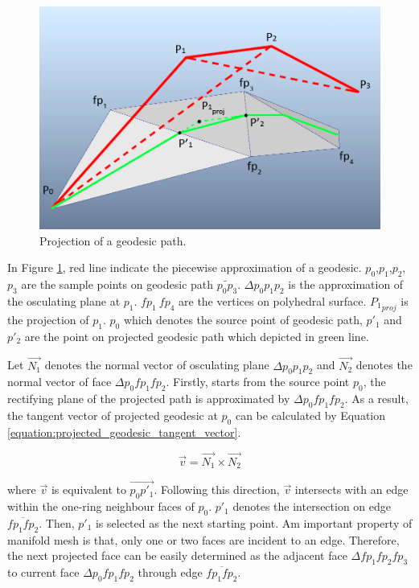 \begin{figure}[H]
    \centering
    \includegraphics[width=0.9\columnwidth]{../images/geodesic_image/projection_demo}
    \caption{Projection of a geodesic path.}
    \label{figure:geodesic_projection}
\end{figure}

In Figure \ref{figure:geodesic_projection}, red line indicate the piecewise approximation of a geodesic. $p_{0}$,$p_{1}$,$p_{2}$,$p_{3}$ are the sample points on geodesic path $\widetilde{p_0p_3}$. $\Delta p_{0}p_{1}p_{2}$ is the approximation of the osculating plane at $p_{1}$. $fp_{1} ~ fp_{4}$ are the vertices on polyhedral surface. ${P_{1}}_{proj}$ is the projection of $p_{1}$. $p_{0}$ which denotes the source point of geodesic path, $p'_{1}$ and $p'_{2}$ are the point on projected geodesic path which depicted in green line.

Let $\vec{N_{1}}$ denotes the normal vector of osculating plane $\Delta p_{0}p_{1}p_{2}$ and $\vec{N_{2}}$ denotes the normal vector of face $\Delta p_{0}fp_{1}fp_{2}$. Firstly, starts from the source point $p_{0}$, the rectifying plane of the projected path is approximated by $\Delta p_{0}fp_{1}fp_{2}$. As a result, the tangent vector of projected geodesic at $p_{0}$ can be calculated by Equation \ref{equation:projected_geodesic_tangent_vector}. 

\begin{equation}
\vec{v} = \vec{N_{1}} \times \vec{N_{2}}
\label{equation:projected_geodesic_tangent_vector}
\end{equation}

where $\vec{v}$ is equivalent to $\vec{p_{0}p'_{1}}$. Following this direction, $\vec{v}$ intersects with an edge within the one-ring neighbour faces of $p_{0}$. $p'_{1}$ denotes the intersection on edge $\overline{fp_{1}fp_{2}}$. Then, $p'_{1}$ is selected as the next starting point. Am important property of manifold mesh is that, only one or two faces are incident to an edge. Therefore, the next projected face can be easily determined as the adjacent face $\Delta fp_{1}fp_{2}fp_{3}$ to current face $\Delta p_{0}fp_{1}fp_{2}$ through edge $\overline{fp_{1}fp_{2}}$. 

